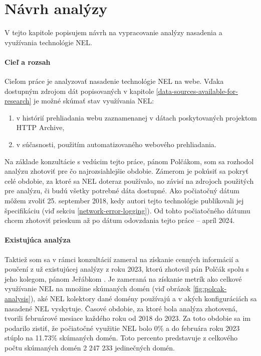 \chapter{Návrh analýzy}
\label{possible-analysis-strategies}

V tejto kapitole popisujem návrh na vypracovanie analýzy nasadenia a využívania technológie NEL.

\subsubsection{Cieľ a rozsah}

Cieľom práce je analyzovať nasadenie technológie NEL na webe. 
Vďaka dostupným zdrojom dát popisovaných v kapitole \ref{data-sources-available-for-research} je možné skúmať stav využívania NEL:
\begin{enumerate}
    \item v histórií prehliadania webu zaznamenanej v dátach poskytovaných projektom HTTP Archive,
    \item v súčasnosti, použitím automatizovaného webového prehliadania.
\end{enumerate}

Na základe konzultácie s vedúcim tejto práce, pánom Polčákom, som sa rozhodol analýzu zhotoviť pre čo 
najrozsiahlejšie obdobie.
Zámerom je pokúsiť sa pokryť celé obdobie, za ktoré sa NEL doteraz používalo, no závisí na zdrojoch použitých pre analýzu, či budú všetky potrebné dáta dostupné.
Ako počiatočný dátum môžem zvoliť 25. september 2018, kedy autori tejto technológie publikovali jej špecifikáciu (viď sekciu \ref{network-error-logging}).
Od tohto počiatočného dátumu chcem zhotoviť prieskum až po dátum odovzdania tejto práce -- apríl 2024.

\subsubsection{Existujúca analýza}

Taktiež som sa v rámci konzultácií zameral na získanie cenných informácií a poučení z už existujúcej analýzy z roku 2023,
ktorú zhotovil pán Polčák spolu s jeho kolegom, pánom Jeřábkom \cite{nel-http-archive}.
Je zameraná na získanie metrík ako celkové využívanie NEL na množine skúmaných domén (viď obrázok \ref{fig:polcak-analysis}), aké NEL kolektory dané domény používajú a v akých konfiguráciách sa nasadené NEL vyskytuje.
Časové obdobie, za ktoré bola analýza zhotovená, tvorili februárové mesiace každého roku od 2018 do 2023. 
Za toto obdobie sa im podarilo zistiť, že počiatočné využitie NEL bolo 0\% a do februára roku 2023 stúplo na 11.73\% skúmaných domén.
Toto percento predstavuje z celkového počtu skúmaných domén 2 247 233 jedinečných domén.

